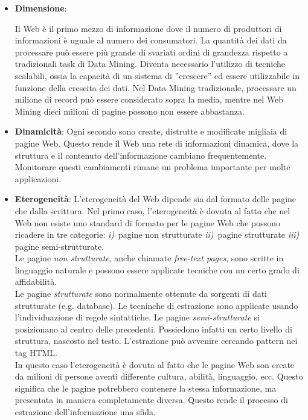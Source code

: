 \begin{itemize}
\item \textbf{Dimensione}: 

Il Web è il primo mezzo di informazione dove il numero di produttori di informazioni è uguale al numero dei consumatori. La quantità dei dati da processare può essere più grande di svariati ordini di grandezza rispetto a tradizionali task di Data Mining. Diventa necessario l'utilizzo di tecniche scalabili, ossia la capacità di un sistema di ''crescere'' ed essere utilizzabile in funzione della crescita dei dati. Nel Data Mining tradizionale, processare un milione di record può essere considerato sopra la media, mentre nel Web Mining dieci milioni di pagine possono non essere abbastanza. 

\item \textbf{Dinamicità}: 
Ogni secondo sono create, distrutte e modificate migliaia di pagine Web. Questo rende il Web una rete di informazioni dinamica, dove la struttura e il contenuto dell'informazione cambiano frequentemente. Monitorare questi cambiamenti rimane un problema importante per molte applicazioni.

\item \textbf{Eterogeneità}:
L'eterogeneità del Web dipende sia dal formato delle pagine che dalla scrittura. Nel primo caso, l'eterogeneità è dovuta al fatto che nel Web non esiste uno standard di formato per le pagine Web che possono ricadere in tre categorie: \textit{i)}~pagine non strutturate \textit{ii)}~pagine strutturate \textit{iii)}~ pagine semi-strutturate.
\\
Le pagine \textit{non strutturate}, anche chiamate \textit{free-text pages}, sono scritte in linguaggio naturale e possono essere applicate tecniche con un certo grado di affidabilità.
\\
Le pagine \textit{strutturate} sono normalmente ottenute da sorgenti di dati strutturate (e.g. database). Le tecninche di estrazione sono applicate usando l'individuazione di regole sintattiche.
Le pagine \textit{semi-strutturate} si posizionano al centro delle precedenti. Possiedono infatti un certo livello di struttura, nascosto nel testo. L'estrazione può avvenire cercando pattern nei tag HTML.
\\
In questo caso l'eterogeneità è dovuta al fatto che le pagine Web son create da milioni di persone aventi differente cultura, abilità, linguaggio, ecc. Questo significa che le pagine potrebbero contenere la stessa informazione, ma presentata in maniera completamente diversa. Questo rende il processo di estrazione dell'informazione una sfida.


\end{itemize}
